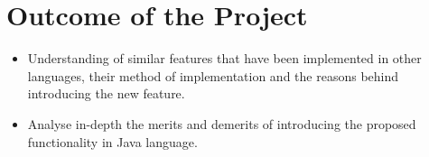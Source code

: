 \section{Outcome of the Project}
\begin{itemize}
\item Understanding of similar features that have been implemented in other languages, their method of implementation and the reasons behind introducing the new feature. 
\item Analyse in-depth the merits and demerits of introducing the proposed functionality in Java language.
\end{itemize}